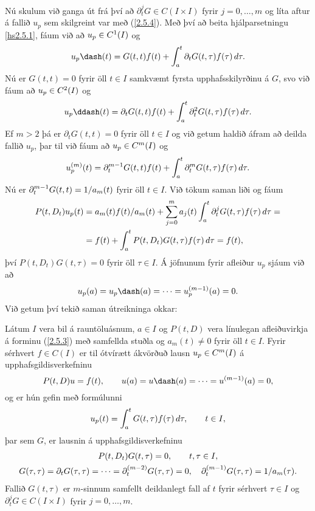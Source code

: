 Nú skulum við ganga út frá því að $\partial_t^{j}G\in C(I\times I)$ 
fyrir $j=0,\dots,m$ og líta
aftur á fallið $u_p$ sem skilgreint var með (\ref{2.5.4}). 
Með því að beita hjálparsetningu \ref{hs2.5.1}, fáum við að $u_p\in C\sp
1(I)$  og
 $$u_p\dash(t) = G(t,t)f(t)+\int_a\sp t \partial_t G(t,\tau)f(\tau) \, d\tau.
 $$
Nú er $G(t,t)=0$ fyrir öll $t\in I$ samkvæmt fyrsta upphafsskilyrðinu
á $G$, svo við fáum að $u_p\in C\sp 2(I)$ og
 $$u_p\ddash(t) = \partial_tG(t,t)f(t)
+\int_a\sp t \partial_t^2G(t,\tau)f(\tau) \, d\tau.
 $$
Ef $m > 2$ þá er $\partial_tG(t,t)=0$ fyrir öll $t\in I$
og við getum haldið áfram að deilda fallið $u_p$, þar til við fáum að
$u_p\in C\sp m(I)$ og  
 $$
u_p\sp{(m)}(t) = \partial_t^{m-1}G(t,t)f(t)+\int_a\sp t
\partial_t^mG(t,\tau)f(\tau) \, d\tau. 
 $$
Nú er $\partial_t\sp{m-1}G(t,t)=1/a_m(t)$ fyrir öll $t\in I$.  
Við tökum saman liði og fáum
\begin{align*}
P(t,D_t)u_p(t)&=
a_m(t)f(t)/a_m(t) +\sum\limits_{j=0}\sp m
a_j(t)\int_a\sp t \partial_t^jG(t,\tau)f(\tau)\, d\tau=\\
&=f(t)+\int_a\sp t P(t,D_t)G(t,\tau)f(\tau)\, d\tau=f(t),
\end{align*}
því $P(t,D_t)G(t,\tau)=0$ fyrir öll $\tau\in I$. Á jöfnunum fyrir
afleiður $u_p$ sjáum við að  
$$u_p(a)=u_p\dash(a)=\cdots=u_p\sp{(m-1)}(a)=0.$$
 Við getum því tekið saman útreikninga okkar:

\begin{se}
Látum $I$ vera bil á rauntöluásnum,  $a\in I$ og $P(t,D)$ vera
línu\-legan afleiðuvirkja á forminu (\ref{2.5.3}) með samfellda stuðla
og $a_m(t)\neq 0$ fyrir öll $t\in I$. 
Fyrir sérhvert $f\in C(I)$ er til ótvírætt ákvörðuð lausn $u_p\in
C\sp m(I)$ á
upphafsgildisverkefninu 
 \begin{equation*}P(t,D)u=f(t), \qquad u(a)=u\dash(a)=\cdots=u\sp{(m-1)}(a)=0,\label{2.5.5}
 \end{equation*}
og er hún gefin með formúlunni
\begin{equation*}u_p(t) = \int_a\sp t G(t,\tau)f(\tau) \, d\tau, \qquad t\in I,\label{2.5.6}
\end{equation*}
þar sem $G$, er lausnin á  upphafsgildisverkefninu
 \begin{gather*}
P(t,D_t)G(t,\tau)=0,  \qquad t,\tau\in I,\label{2.5.7}\\
G(\tau,\tau)=\partial_tG(\tau,\tau)=\cdots=
\partial_t\sp{(m-2)}G(\tau,\tau)=0, \quad
\partial_t\sp{(m-1)}G(\tau,\tau)=1/a_m({\tau})\label{2.5.8}. 
\end{gather*}
 Fallið $G(t,\tau)$ er $m$-sinnum samfellt deildanlegt fall af $t$
fyrir sérhvert $\tau\in I$ og 
$\partial_t^jG\in C(I\times I)$ fyrir $j=0,\dots,m$. 
\end{se}



